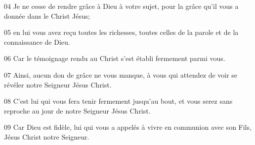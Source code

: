 
04 Je ne cesse de rendre grâce à Dieu à votre sujet, pour la grâce qu’il vous a donnée dans le Christ Jésus;

05 en lui vous avez reçu toutes les richesses, toutes celles de la parole et de la connaissance de Dieu.

06 Car le témoignage rendu au Christ s’est établi fermement parmi vous.

07 Ainsi, aucun don de grâce ne vous manque, à vous qui attendez de voir se révéler notre Seigneur Jésus Christ.

08 C’est lui qui vous fera tenir fermement jusqu’au bout, et vous serez sans reproche au jour de notre Seigneur Jésus Christ.

09 Car Dieu est fidèle, lui qui vous a appelés à vivre en communion avec son Fils, Jésus Christ notre Seigneur.
